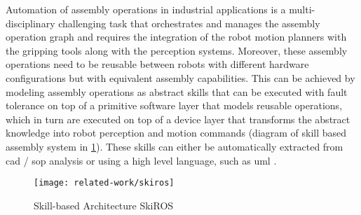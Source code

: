 Automation of assembly operations in industrial applications \cite{Patel2012} is a multi-disciplinary challenging task that orchestrates and manages the assembly operation graph and requires the integration of the robot motion planners with the gripping tools \cite{Thomas2015} along with the perception systems. Moreover, these assembly operations need to be reusable \cite{Butting2016,Andersen2014} between robots with different hardware configurations \cite{Thomas2002} but with equivalent assembly capabilities. This can be achieved by modeling assembly operations as abstract skills \cite{Holz2015} that can be executed with fault tolerance \cite{ThomasICRA2003} on top of a primitive software layer that models reusable operations, which in turn are executed on top of a device layer that transforms the abstract knowledge into robot perception and motion commands (diagram of skill based assembly system in \cref{fig:skiros}). These skills can either be automatically extracted from \gls{cad} / \gls{sop} analysis \cite{Thomas2001} or using a high level language, such as \gls{uml} \cite{ThomasICRA2013}.

\begin{figure}[H]
	\centering
	\texttt{[image: related-work/skiros]}
	\caption[Skill-based Architecture SkiROS]{Skill-based Architecture SkiROS \cite{Holz2015}}
	\label{fig:skiros}
\end{figure}





